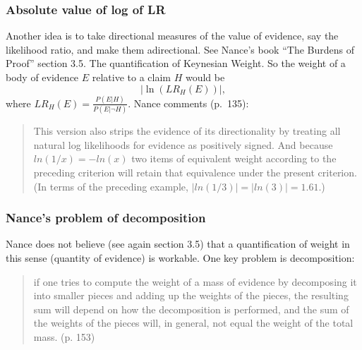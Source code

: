 \documentclass[
  10pt,
  dvipsnames,enabledeprecatedfontcommands]{scrartcl}
\begin{document}

\hypertarget{absolute-value-of-log-of-lr}{%
\subsubsection{Absolute value of log of
LR}\label{absolute-value-of-log-of-lr}}

Another idea is to take directional measures of the value of evidence,
say the likelihood ratio, and make them adirectional. See Nance's book
``The Burdens of Proof'' section 3.5. The quantification of Keynesian
Weight. So the weight of a body of evidence \(E\) relative to a claim
\(H\) would be \[\vert \ln (LR_H(E)) \vert, \] where
\(LR_H(E)=\frac{P(E \vert H)}{P(E \vert \neg H)}\). Nance comments
(p.~135):

\begin{quote}
This version also strips the evidence of its directionality by treating all natural log likelihoods for evidence as positively signed. And because 
$ln(1/x) = -ln(x)$
two items of equivalent weight according to the preceding criterion will retain that equivalence under the present criterion. (In terms of the preceding example, 
$|ln(1/3)|= |ln(3)| = 1.61.$)
\end{quote}

\hypertarget{nances-problem-of-decomposition}{%
\subsubsection{Nance's problem of
decomposition}\label{nances-problem-of-decomposition}}

Nance does not believe (see again section 3.5) that a quantification of
weight in this sense (quantity of evidence) is workable. One key problem
is decomposition:

\begin{quote}
 if one tries to compute the weight of a mass of evidence by decomposing it into smaller pieces and adding up the weights of the pieces, the resulting sum will depend on how the decomposition is performed, and the sum of the weights of the pieces will, in general, not equal the weight of the total mass. (p. 153)
\end{quote}

\end{document}
